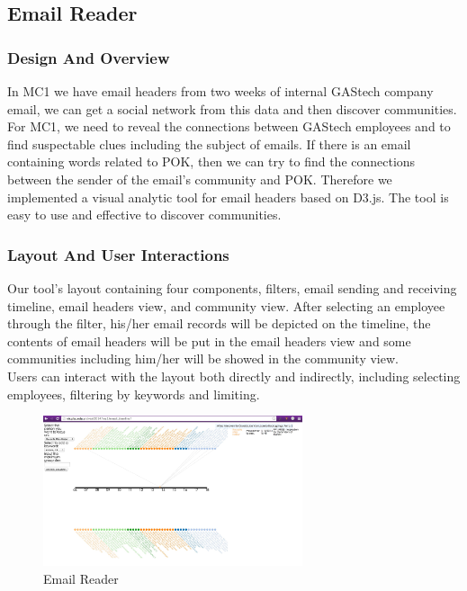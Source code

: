 \documentclass{vgtc}                          %
\begin{document}
\subsection{Email Reader}
\subsubsection{Design And Overview}
In MC1 we have email headers from two weeks of internal GAStech company email, we can get a social network from this data and then discover communities. For MC1, we need to reveal the connections between GAStech employees and to find suspectable clues including the subject of emails. If there is an email containing words related to POK, then we can try to find the connections between the sender of the email's community and POK. Therefore we implemented a visual analytic tool for email headers based on D3.js. The tool is easy to use and effective to discover communities. 

\subsubsection{Layout And User Interactions}
Our tool's layout containing four components, filters, email sending and receiving timeline, email headers view, and community view.
After selecting an employee through the filter, his/her email records will be depicted on the timeline, the contents of email headers will be put in the email headers view and some communities including him/her will be showed in the community view.  \\
Users can interact with the layout both directly and indirectly, including selecting employees, filtering by keywords and limiting. 
\begin{figure}[htb]
  \centering
  \includegraphics[width=3in]{image_et.png}
  \caption{Email Reader}
\end{figure}
\end{document}
